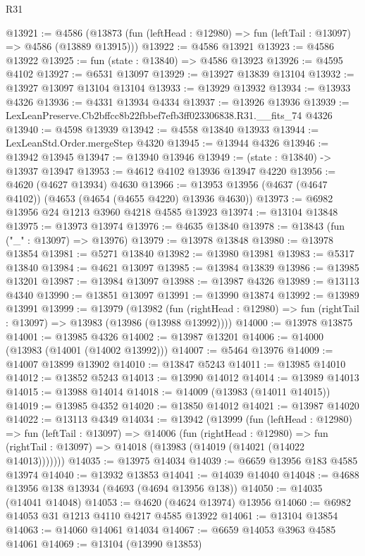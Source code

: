 \begin{lexlean}{R31}
\begin{coremodule}
@13921 := @4586
    (@13873 (fun (leftHead : @12980) => fun (leftTail : @13097) => @4586 (@13889 @13915)))
@13922 := @4586 @13921
@13923 := @4586 @13922
@13925 := fun (state : @13840) => @4586 @13923
@13926 := @4595 @4102
@13927 := @6531 @13097
@13929 := @13927 @13839 @13104
@13932 := @13927 @13097 @13104 @13104
@13933 := @13929 @13932
@13934 := @13933 @4326
@13936 := @4331 @13934 @4334
@13937 := @13926 @13936
@13939 := LexLeanPreserve.Cb2bffcc8b22fbbef7efb3ff023306838.R31.__fits_74 @4326
@13940 := @4598 @13939
@13942 := @4558 @13840 @13933
@13944 := LexLeanStd.Order.mergeStep @4320
@13945 := @13944 @4326
@13946 := @13942 @13945
@13947 := @13940 @13946
@13949 := (state : @13840) -> @13937 @13947
@13953 := @4612 @4102 @13936 @13947 @4220
@13956 := @4620 (@4627 @13934) @4630
@13966 := @13953 @13956 (@4637 (@4647 @4102)) (@4653 (@4654 (@4655 @4220) @13936 @4630))
@13973 := @6982 @13956 @24 @1213 @3960 @4218 @4585 @13923
@13974 := @13104 @13848
@13975 := @13973 @13974
@13976 := @4635 @13840
@13978 := @13843 (fun ("_" : @13097) => @13976)
@13979 := @13978 @13848
@13980 := @13978 @13854
@13981 := @5271 @13840
@13982 := @13980 @13981
@13983 := @5317 @13840
@13984 := @4621 @13097
@13985 := @13984 @13839
@13986 := @13985 @13201
@13987 := @13984 @13097
@13988 := @13987 @4326
@13989 := @13113 @4340
@13990 := @13851 @13097
@13991 := @13990 @13874
@13992 := @13989 @13991
@13999 := @13979
    (@13982
      (fun (rightHead : @12980) => fun (rightTail : @13097) => @13983 (@13986 (@13988 @13992))))
@14000 := @13978 @13875
@14001 := @13985 @4326
@14002 := @13987 @13201
@14006 := @14000 (@13983 (@14001 (@14002 @13992)))
@14007 := @5464 @13976
@14009 := @14007 @13899 @13902
@14010 := @13847 @5243
@14011 := @13985 @14010
@14012 := @13852 @5243
@14013 := @13990 @14012
@14014 := @13989 @14013
@14015 := @13988 @14014
@14018 := @14009 (@13983 (@14011 @14015))
@14019 := @13985 @4352
@14020 := @13850 @14012
@14021 := @13987 @14020
@14022 := @13113 @4349
@14034 := @13942
    (@13999
      (fun (leftHead : @12980) =>
      fun (leftTail : @13097) =>
      @14006
        (fun (rightHead : @12980) =>
        fun (rightTail : @13097) => @14018 (@13983 (@14019 (@14021 (@14022 @14013)))))))
@14035 := @13975 @14034
@14039 := @6659 @13956 @183 @4585 @13974
@14040 := @13932 @13853
@14041 := @14039 @14040
@14048 := @4688 @13956 @138 @13934 (@4693 (@4694 @13956 @138))
@14050 := @14035 (@14041 @14048)
@14053 := @4620 (@4624 @13974) @13956
@14060 := @6982 @14053 @31 @1213 @4110 @4217 @4585 @13922
@14061 := @13104 @13854
@14063 := @14060 @14061 @14034
@14067 := @6659 @14053 @3963 @4585 @14061
@14069 := @13104 (@13990 @13853)

\end{coremodule}
\end{lexlean}
